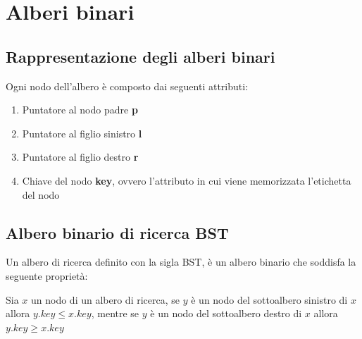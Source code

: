 \section{Alberi binari}
\subsection{Rappresentazione degli alberi binari}
Ogni nodo dell'albero è composto dai seguenti attributi:
\begin{enumerate}
    \item Puntatore al nodo padre \textbf{p}
    \item Puntatore al figlio sinistro \textbf{l}
    \item Puntatore al figlio destro \textbf{r}
    \item Chiave del nodo \textbf{key}, ovvero l'attributo in cui viene memorizzata l'etichetta del nodo
\end{enumerate}
\noindent \subsection{Albero binario di ricerca BST}
Un albero di ricerca definito con la sigla BST, è un albero binario che soddisfa la seguente proprietà:
\begin{definition}
   Sia $x$ un nodo di un albero di ricerca, se $y$ è un nodo del sottoalbero sinistro di $x$ allora 
   $y.key \le x.key$, mentre se $y$ è un nodo del sottoalbero destro di $x$ allora $y.key \ge x.key$  
\end{definition}
